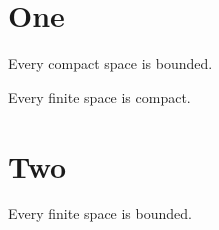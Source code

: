 \documentclass{journalart}
\begin{document}
\section{One}
\begin{theorem} Every compact space is bounded. \end{theorem}
\begin{lemma} Every finite space is compact. \end{lemma}
\section{Two}
\begin{theorem} Every finite space is bounded. \end{theorem}
\end{document}
